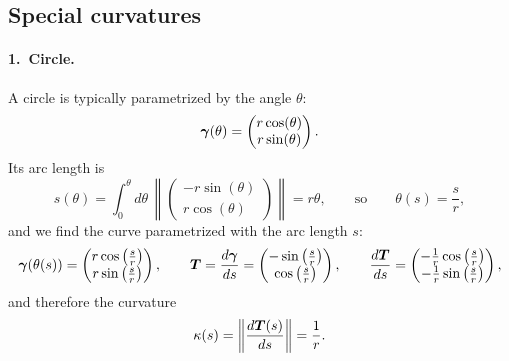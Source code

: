 \subsection{Special curvatures}
\label{sec:curvature-special}

\paragraph{1.\ Circle.}
A circle is typically parametrized by the angle $\theta$:
\[
  \bm{\gamma}(\theta) =
  \begin{pmatrix} r\cos(\theta) \\ r\sin(\theta) \end{pmatrix} .
\]
Its arc length is
\[
  s(\theta) = \int_0^\theta d\theta \,
  \left\lVert \begin{pmatrix} -r\sin(\theta) \\ r\cos(\theta) \end{pmatrix} \right\rVert
  = r\theta ,
  \qquad\text{so}\qquad
  \theta(s) = \frac{s}{r} ,
\]
and we find the curve parametrized with the arc length $s$:
\[
  \bm{\gamma}(\theta(s)) =
  \begin{pmatrix} r\cos\left(\frac{s}{r}\right) \\ r\sin\left(\frac{s}{r}\right) \end{pmatrix} ,
  \qquad
  \bm{T} = \frac{d\bm{\gamma}}{ds} =
  \begin{pmatrix} -\sin\left(\frac{s}{r}\right) \\ \cos\left(\frac{s}{r}\right) \end{pmatrix} ,
  \qquad
  \frac{d\bm{T}}{ds} =
  \begin{pmatrix} -\frac{1}{r}\cos\left(\frac{s}{r}\right) \\
                  -\frac{1}{r}\sin\left(\frac{s}{r}\right) \end{pmatrix} ,
\]
and therefore the curvature
\[
  \kappa(s) = \left\lVert \frac{d\bm{T}(s)}{ds} \right\rVert = \frac{1}{r} .
\]

